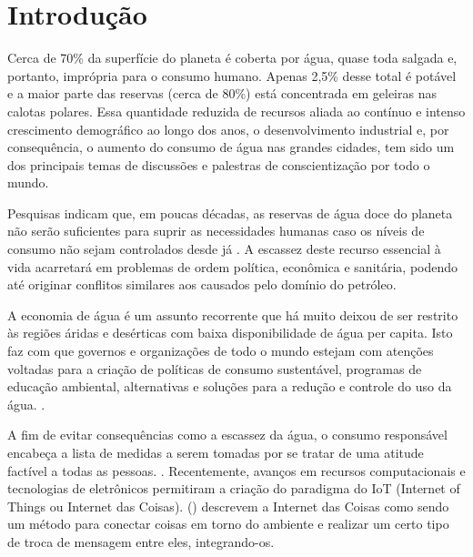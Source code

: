 \chapter[Introdução]{Introdução}

Cerca de 70\% da superfície do planeta é coberta por água, quase toda salgada e, portanto, imprópria para o consumo humano. Apenas 2,5\% desse total é potável e a maior parte das reservas (cerca de 80\%) está concentrada em geleiras nas calotas polares. 
Essa quantidade reduzida de recursos aliada ao contínuo e intenso crescimento demográfico ao longo dos anos, o desenvolvimento industrial e, por consequência, o aumento do consumo de água nas grandes cidades, tem sido um dos principais temas de discussões e palestras de conscientização por todo o mundo. \cite{aguaconsumo}

Pesquisas indicam que, em poucas décadas, as reservas de água doce do planeta não serão suficientes para suprir as necessidades humanas caso os níveis de consumo não sejam controlados desde já \cite{Diarias2007}. A escassez deste recurso essencial à vida acarretará em problemas de ordem política, econômica e sanitária, podendo até originar conflitos similares aos causados pelo domínio do petróleo.

A economia de água é um assunto recorrente que há muito deixou de ser restrito às regiões áridas e desérticas com baixa disponibilidade de água per capita. Isto faz com que governos e organizações de todo o mundo estejam com atenções voltadas para a criação de políticas de consumo sustentável, programas de educação ambiental, alternativas e soluções para a redução e controle do uso da água. \cite{ferreirasistema}.

A fim de evitar consequências como a escassez da água, o consumo
responsável encabeça a lista de medidas a serem tomadas por se tratar de uma atitude factível a todas as pessoas. \cite{Diarias2007}. Recentemente, avanços em recursos computacionais e tecnologias de eletrônicos permitiram a criação do paradigma do IoT (Internet of Things ou Internet das Coisas). \citeauthor{Perumal2016} (\citeyear{Perumal2016}) descrevem a Internet das Coisas como sendo um método para conectar coisas em torno do ambiente e realizar um certo tipo de troca de mensagem entre eles, integrando-os.

